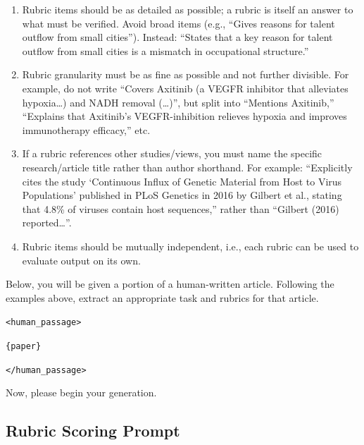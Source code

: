 \documentclass[11pt]{article}
\begin{document}
\begin{tcolorbox}[
  breakable,
  colback=porcelain,
  colframe=gray!75!black,
  left=6pt, right=6pt, top=6pt, bottom=6pt,
  fontupper=\small
]
\begin{enumerate}
\item Rubric items should be as detailed as possible; a rubric is itself an answer to what must be verified. Avoid broad items (e.g., ``Gives reasons for talent outflow from small cities''). Instead: ``States that a key reason for talent outflow from small cities is a mismatch in occupational structure.''
\item Rubric granularity must be as fine as possible and not further divisible. For example, do not write ``Covers Axitinib (a VEGFR inhibitor that alleviates hypoxia\ldots) and NADH removal (\ldots)'', but split into ``Mentions Axitinib,'' ``Explains that Axitinib's VEGFR-inhibition relieves hypoxia and improves immunotherapy efficacy,'' etc.
\item If a rubric references other studies/views, you must name the specific research/article title rather than author shorthand. For example: ``Explicitly cites the study `Continuous Influx of Genetic Material from Host to Virus Populations' published in PLoS Genetics in 2016 by Gilbert et al., stating that 4.8\% of viruses contain host sequences,'' rather than ``Gilbert (2016) reported\ldots''.
\item Rubric items should be mutually independent, i.e., each rubric can be used to evaluate output on its own.
\end{enumerate}

Below, you will be given a portion of a human-written article. Following the examples above, extract an appropriate task and rubrics for that article.


\texttt{<human\_passage>}

\texttt{\{paper\}}

\texttt{</human\_passage>}

Now, please begin your generation.

\end{tcolorbox}

\subsection{Rubric Scoring Prompt}
\end{document}
